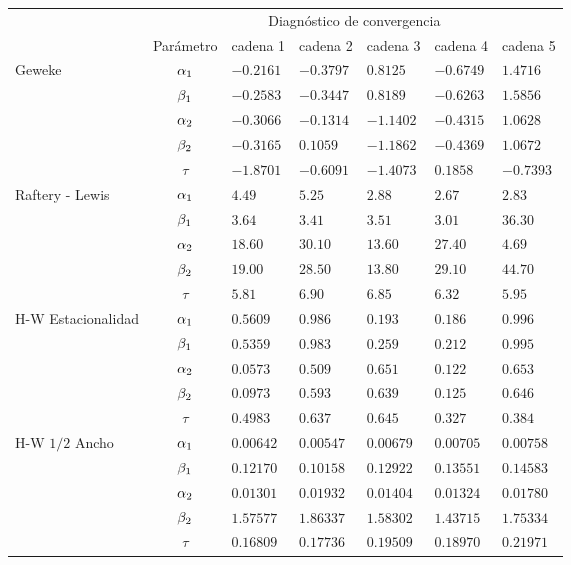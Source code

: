 \begin{table}[!h]
\centering
\begin{tabular}{|l|c|l|l|l|l|l|}
\hline
& \multicolumn{6}{|c|}{Diagnóstico de convergencia} \\
\cline{2-7}
& Parámetro & cadena 1  & cadena 2  & cadena 3 & cadena 4 & cadena 5	 \\
\hline \hline
\multirow{5}{2.5cm}{Geweke} & $\alpha_1$ & $-0.2161$ & $-0.3797$ & $0.8125 $ & $-0.6749$  & $ 1.4716$\\ \cline{2-7}
& $\beta_1$& $-0.2583 $ & $-0.3447$ & $0.8189$ & $-0.6263$ & $ 1.5856$\\
\cline{2-7}
& $\alpha_2$& $-0.3066 $ & $-0.1314 $ & $-1.1402$ & $ -0.4315$ & $1.0628$\\
\cline{2-7}
& $\beta_2$& $-0.3165 $ & $0.1059$ & $-1.1862$ & $ -0.4369$ & $1.0672$\\
\cline{2-7}
& $\tau $& $-1.8701 $ & $-0.6091$ & $-1.4073$ & $0.1858$ & $-0.7393$\\
  \cline{1-7}
  \multirow{5}{2.5cm}{Raftery - Lewis} & $\alpha_1$ & $4.49$ & $5.25  $ & $2.88 $ & $2.67$  & $ 2.83 $\\ \cline{2-7}
& $\beta_1$& $3.64 $ & $3.41 $ & $3.51$ & $3.01$ & $36.30 $\\
\cline{2-7}
& $\alpha_2$ & $18.60  $ & $30.10 $ & $13.60$ & $27.40$ & $4.69$\\
\cline{2-7}
& $\beta_2$& $19.00 $ & $28.50$ & $13.80$ & $29.10 $ & $44.70$\\
\cline{2-7}
& $\tau $& $5.81 $ & $6.90$ & $6.85$ & $6.32 $ & $5.95$\\
  \cline{1-7}
  \multirow{5}{2.5cm}{H-W Estacionalidad} & $\alpha_1$ & $0.5609$ & $0.986 $ & $ 0.193$ & $0.186$  & $0.996$\\ \cline{2-7}
& $\beta_1$& $0.5359  $ & $0.983   $ & $0.259$ & $0.212$ & $0.995$\\
\cline{2-7}
& $\alpha_2$& $0.0573 $ & $0.509$ & $0.651$ & $0.122$ & $0.653$\\
\cline{2-7}
& $\beta_2$& $0.0973 $ & $0.593 $ & $0.639$ & $0.125$ & $0.646$\\
\cline{2-7}
& $\tau$& $0.4983 $ & $0.637 $ & $0.645$ & $0.327$ & $0.384$\\
  \cline{1-7}
  \multirow{5}{2.5cm}{H-W $1/2$ Ancho} & $\alpha_1$ & $0.00642$ & $0.00547 $ & $0.00679$ & $0.00705$  & $ 0.00758$\\ \cline{2-7}
& $\beta_1$& $0.12170 $ & $0.10158$ & $0.12922$ & $0.13551$ & $0.14583$\\
\cline{2-7}
& $\alpha_2$& $0.01301 $ & $0.01932$ & $0.01404$ & $0.01324$ & $0.01780$\\
\cline{2-7}
& $\beta_2$& $1.57577$ & $1.86337$ & $1.58302$ & $ 1.43715$ & $1.75334$\\
\cline{2-7}
& $\tau$& $0.16809  $ & $0.17736$ & $0.19509 $ & $0.18970$ & $0.21971$\\
  \cline{1-7}


\end{tabular}
\end{table}
